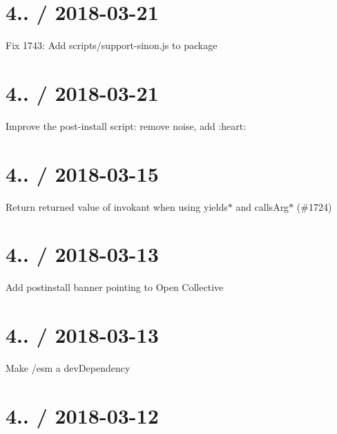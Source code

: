 \section*{4.. / 2018-\/03-\/21 }


\begin{DoxyItemize}
\item Fix 1743\+: Add scripts/support-\/sinon.\+js to package
\end{DoxyItemize}

\section*{4.. / 2018-\/03-\/21 }


\begin{DoxyItemize}
\item Improve the post-\/install script\+: remove noise, add \+:heart\+:
\end{DoxyItemize}

\section*{4.. / 2018-\/03-\/15 }


\begin{DoxyItemize}
\item Return returned value of invokant when using yields$\ast$ and calls\+Arg$\ast$ (\#1724)
\end{DoxyItemize}

\section*{4.. / 2018-\/03-\/13 }


\begin{DoxyItemize}
\item Add postinstall banner pointing to Open Collective
\end{DoxyItemize}

\section*{4.. / 2018-\/03-\/13 }


\begin{DoxyItemize}
\item Make /esm a dev\+Dependency
\end{DoxyItemize}

\section*{4.. / 2018-\/03-\/12 }


